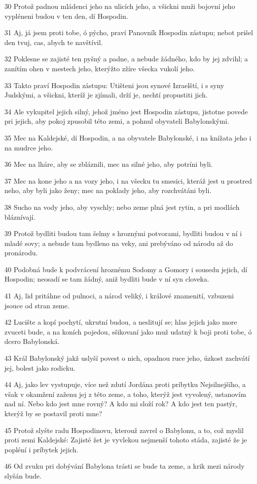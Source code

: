 \par 30 Protož padnou mládenci jeho na ulicích jeho, a všickni muži bojovní jeho vypléneni budou v ten den, dí Hospodin.
\par 31 Aj, já jsem proti tobe, ó pýcho, praví Panovník Hospodin zástupu; nebot prišel den tvuj, cas, abych te navštívil.
\par 32 Poklesne se zajisté ten pyšný a padne, a nebude žádného, kdo by jej zdvihl; a zanítím ohen v mestech jeho, kterýžto zžíre všecka vukolí jeho.
\par 33 Takto praví Hospodin zástupu: Utišteni jsou synové Izraelští, i s syny Judskými, a všickni, kteríž je zjímali, drží je, nechtí propustiti jich.
\par 34 Ale vykupitel jejich silný, jehož jméno jest Hospodin zástupu, jistotne povede pri jejich, aby pokoj zpusobil této zemi, a pohnul obyvateli Babylonskými.
\par 35 Mec na Kaldejské, dí Hospodin, a na obyvatele Babylonské, i na knížata jeho i na mudrce jeho.
\par 36 Mec na lháre, aby se zbláznili, mec na silné jeho, aby potríni byli.
\par 37 Mec na kone jeho a na vozy jeho, i na všecku tu smesici, kteráž jest u prostred neho, aby byli jako ženy; mec na poklady jeho, aby rozchvátáni byli.
\par 38 Sucho na vody jeho, aby vyschly; nebo zeme plná jest rytin, a pri modlách bláznívají.
\par 39 Protož bydliti budou tam šelmy s hroznými potvorami, bydliti budou v ní i mladé sovy; a nebude tam bydleno na veky, ani prebýváno od národu až do pronárodu.
\par 40 Podobná bude k podvrácení hroznému Sodomy a Gomory i sousedu jejich, dí Hospodin; neosadí se tam žádný, aniž bydliti bude v ní syn cloveka.
\par 41 Aj, lid pritáhne od pulnoci, a národ veliký, i králové znamenití, vzbuzeni jsouce od stran zeme.
\par 42 Lucište a kopí pochytí, ukrutní budou, a neslitují se; hlas jejich jako more zvuceti bude, a na koních pojedou, sšikovaní jako muž udatný k boji proti tobe, ó dcero Babylonská.
\par 43 Král Babylonský jakž uslyší povest o nich, opadnou ruce jeho, úzkost zachvátí jej, bolest jako rodicku.
\par 44 Aj, jako lev vystupuje, více než zdutí Jordána proti príbytku Nejsilnejšího, a však v okamžení zaženu jej z této zeme, a toho, kterýž jest vyvolený, ustanovím nad ní. Nebo kdo jest mne rovný? A kdo mi složí rok? A kdo jest ten pastýr, kterýž by se postavil proti mne?
\par 45 Protož slyšte radu Hospodinovu, kterouž zavrel o Babylonu, a to, což myslil proti zemi Kaldejské: Zajisté žet je vyvlekou nejmenší tohoto stáda, zajisté že je popléní i príbytek jejich.
\par 46 Od zvuku pri dobývání Babylona trásti se bude ta zeme, a krik mezi národy slyšán bude.

